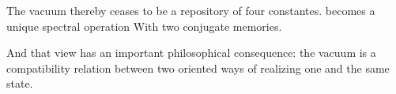 The vacuum thereby ceases to be a repository of four constantes. becomes a unique spectral operation With two conjugate memories.\par

And that view has an important philosophical consequence: the vacuum is a compatibility relation between two oriented ways of realizing one and the same state.\par

